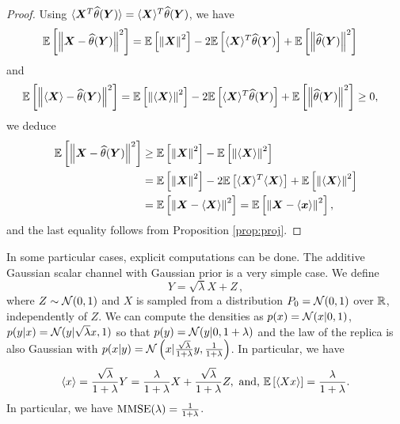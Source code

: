 \documentclass[12pt,nocut]{article}
\begin{document}
\begin{proof}
Using $\langle {\boldsymbol X}^T\widehat{\theta}({\boldsymbol Y})\rangle  = \langle {\boldsymbol X}\rangle^T \widehat{\theta}({\boldsymbol Y})$, we have
\begin{align*}
\mathbb{E} \left[ \left\| {\boldsymbol X} -  \widehat{\theta}({\boldsymbol Y})\right\|^2 \right] & = \mathbb{E}\left[ \left\| {\boldsymbol X}\right\|^2\right] - 2 \mathbb{E} \left[ \langle {\boldsymbol X}\rangle^T \widehat{\theta}({\boldsymbol Y})\right] + \mathbb{E}\left[ \left\| \widehat{\theta}({\boldsymbol Y})\right\|^2\right]
\end{align*}
and 
\begin{align*}
\mathbb{E} \left[ \left\|\langle {\boldsymbol X}\rangle -  \widehat{\theta}({\boldsymbol Y})\right\|^2 \right] & = \mathbb{E}\left[ \left\| \langle {\boldsymbol X}\rangle\right\|^2\right] - 2 \mathbb{E} \left[ \langle {\boldsymbol X}\rangle^T \widehat{\theta}({\boldsymbol Y})\right] + \mathbb{E}\left[ \left\| \widehat{\theta}({\boldsymbol Y})\right\|^2\right]\geq 0,
\end{align*}
we deduce
\begin{align*}
\mathbb{E} \left[ \left\| {\boldsymbol X} -  \widehat{\theta}({\boldsymbol Y})\right\|^2 \right] & \geq \mathbb{E}\left[ \left\| {\boldsymbol X}\right\|^2\right] - \mathbb{E}\left[ \left\| \langle {\boldsymbol X}\rangle\right\|^2\right]\\
& = \mathbb{E}\left[ \left\| {\boldsymbol X}\right\|^2\right] -2\mathbb{E} \left[ \langle {\boldsymbol X}\rangle^T\langle {\boldsymbol X}\rangle \right] + \mathbb{E}\left[ \left\| \langle {\boldsymbol X}\rangle\right\|^2\right]\\
& = \mathbb{E} \left[ \left\| {\boldsymbol X} - \langle {\boldsymbol X}\rangle \right\|^2 \right]= \mathbb{E} \left[ \left\| {\boldsymbol X} - \langle {\boldsymbol x} \rangle \right\|^2 \right],
\end{align*}
and the last equality follows from Proposition \ref{prop:proj}.
\end{proof}

\begin{example}
In some particular cases, explicit computations can be done. The additive Gaussian scalar channel with Gaussian prior is a very simple case. We define
\begin{equation}\label{eq:additive_scalar_channel}
	Y = \sqrt{\lambda} X + Z \,,
\end{equation}
where $Z \sim \mathcal{N}(0,1)$ and $X$ is sampled from a distribution $P_0= \mathcal{N}(0,1)$ over $\mathbb{R}$, independently of $Z$. We can compute the densities as $p(x) = \mathcal{N}(x|0,1)$, $p(y|x) = \mathcal{N}(y|\sqrt{\lambda} x,1)$ so that $p(y) = \mathcal{N}(y|0, 1+\lambda)$ and the law of the replica is also Gaussian with $p(x|y) =\mathcal{N}\left(x|\frac{\sqrt{\lambda}}{1+\lambda}y,\frac{1}{1+\lambda}\right)$. In particular, we have
$$
\langle x \rangle = \frac{\sqrt{\lambda}}{1+\lambda}Y = \frac{\lambda}{1+\lambda}X+\frac{\sqrt{\lambda}}{1+\lambda}Z, \text{ and, }  \mathbb{E} \left[\langle X  x \rangle \right] = \frac{\lambda}{1+\lambda}.
$$
In particular, we have ${{\rm MMSE}}(\lambda) = \frac{1}{1+\lambda}$.
\end{example}
\end{document}
